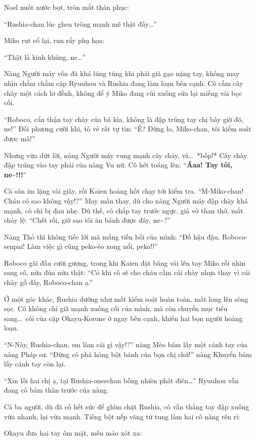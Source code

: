 \documentclass[../main.tex]{subfiles}
\begin{document}
Noel nuốt nước bọt, tròn mắt thán phục:

``Rushia-chan lúc ghen trông mạnh mẽ thật đấy\dots''

Miko rụt cổ lại, run rẩy phụ họa:

``Thật là kinh khủng, ne\dots''

Nàng Người máy vốn đã khá lúng túng khi phải giã gạo nặng tay, không may nhìn chằm chằm cặp Ryuuhou và Rushia đang làm loạn bên cạnh. Cô cầm cây chày một cách lơ đễnh, không để ý Miko đang cúi xuống sửa lại miếng vải bọc cối.

``Roboco, cẩn thận tay chày của bà kìa, không là đập trúng tay chị bây giờ đó, ne!'' Đối phương cười khì, tỏ vẻ rất tự tin: ``Ể? Đừng lo, Miko-chan, tôi kiểm soát được mà!''

Nhưng vừa dứt lời, nàng Người máy vung mạnh cây chày, và\dots\ *bốp!* Cây chày đập trúng vào tay phải của nàng Vu nữ. Cô hét toáng lên: ``\textbf{Áaa! Tay tôi, ne\~{}!!!}''

Cả sân im lặng vài giây, rồi Kaien hoảng hốt chạy tới kiểm tra. ``M-Miko-chan! Cháu có sao không vậy!?'' May mắn thay, dù cho nàng Người máy đập chày khá mạnh, cô chỉ bị đau nhẹ. Dù thế, cô chắp tay trước ngực, giả vờ than thở, mắt chảy lệ: ``Chết rồi, giờ sao tôi ăn bánh được đây, ne\~{}?''

Nàng Thỏ thì không tiếc lời mà mắng tiền bối của mình: ``Đồ hậu đậu, Roboco-senpai! Làm việc gì cũng peko-éo xong nổi, peko!!''

Roboco gãi đầu cười gượng, trong khi Kaien đặt băng vải lên tay Miko rồi nhìn sang cô, nửa đùa nửa thật: ``Có khi cô sẽ cho cháu cầm cái chày nhựa thay vì cái chày gỗ đấy, Roboco-chan ạ.''

Ở một góc khác, Rushia dường như mất kiểm soát hoàn toàn, mắt long lên sòng sọc. Cô không chỉ giã mạnh xuống cối của mình, mà còn chuyển mục tiêu sang\dots\ cối của cặp Okayu-Korone ở ngay bên cạnh, khiến hai bọn người hoảng loạn.

``N-Này, Rushia-chan, em làm cái gì vậy!?'' nàng Mèo bám lấy một cánh tay của nàng Pháp sư. ``Đừng có phá hỏng bột bánh của bọn chị chứ!'' nàng Khuyển bám lấy cánh tay còn lại.

``Xin lỗi hai chị ạ, tại Rushia-oneechan bỗng nhiên phát điên\dots'' Ryuuhou vẫn đang cố bám thân trước của nàng.

Cả ba người, dù đã cố hết sức để ghìm chặt Rushia, cô vẫn thẳng tay đập xuống vừa nhanh, lại vừa mạnh. Tiếng bột nếp văng tứ tung làm hai cô nàng rên rỉ:

Okayu đưa hai tay ôm mặt, mếu máo xót xa:
\end{document}
